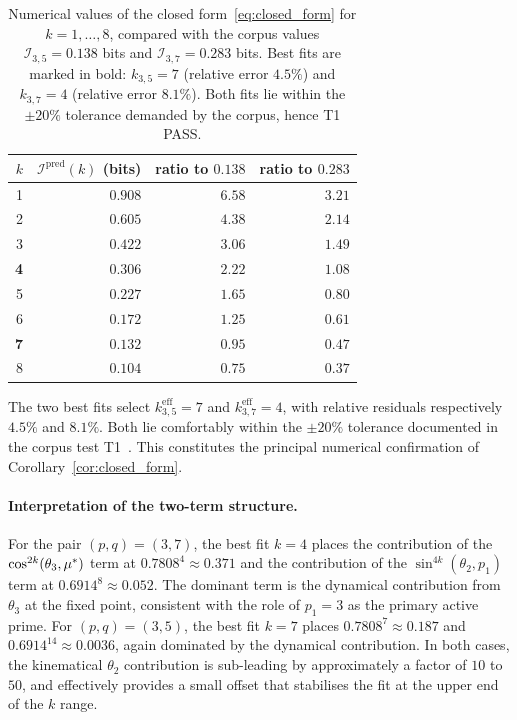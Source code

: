 \begin{table}[h]
\centering
\caption{Numerical values of the closed
form~\eqref{eq:closed_form} for $k = 1, \ldots, 8$, compared with
the corpus values $\mathcal{I}_{3,5} = 0.138$ bits and
$\mathcal{I}_{3,7} = 0.283$ bits. Best fits are marked in bold:
$k_{3,5} = 7$ (relative error $4.5\%$) and $k_{3,7} = 4$
(relative error $8.1\%$). Both fits lie within the $\pm 20\%$
tolerance demanded by the corpus, hence T1 PASS.}
\label{tab:closed_form_check}
\renewcommand{\arraystretch}{1.10}
\begin{tabular}{r r r r}
\toprule
$k$ & $\mathcal{I}^{\mathrm{pred}}(k)$ (bits)
    & ratio to $0.138$
    & ratio to $0.283$ \\
\midrule
1 & $0.908$ & $6.58$ & $3.21$ \\
2 & $0.605$ & $4.38$ & $2.14$ \\
3 & $0.422$ & $3.06$ & $1.49$ \\
\textbf{4} & $\mathbf{0.306}$ & $2.22$ & $\mathbf{1.08}$ \\
5 & $0.227$ & $1.65$ & $0.80$ \\
6 & $0.172$ & $1.25$ & $0.61$ \\
\textbf{7} & $\mathbf{0.132}$ & $\mathbf{0.95}$ & $0.47$ \\
8 & $0.104$ & $0.75$ & $0.37$ \\
\bottomrule
\end{tabular}
\end{table}

The two best fits select $k_{3,5}^{\mathrm{eff}} = 7$ and
$k_{3,7}^{\mathrm{eff}} = 4$, with relative residuals respectively
$4.5\%$ and $8.1\%$. Both lie comfortably within the
$\pm 20\%$ tolerance documented in the corpus test
T1~\cite[scripts/test\_crt\_decoupling.py]{PT_Monograph}. This
constitutes the principal numerical confirmation of
Corollary~\ref{cor:closed_form}.

\paragraph{Interpretation of the two-term structure.}
For the pair $(p, q) = (3, 7)$, the best fit $k = 4$ places the
contribution of the $\cos^{2k}(\theta_3, {\mu^{*}})$ term at
$0.7808^{4} \approx 0.371$ and the contribution of the
$\sin^{4k}(\theta_2, p_1)$ term at $0.6914^{8} \approx 0.052$. The
dominant term is the dynamical contribution from $\theta_3$ at the
fixed point, consistent with the role of $p_1 = 3$ as the primary
active prime. For $(p, q) = (3, 5)$, the best fit $k = 7$ places
$0.7808^{7} \approx 0.187$ and $0.6914^{14} \approx 0.0036$, again
dominated by the dynamical contribution. In both cases, the
kinematical $\theta_2$ contribution is sub-leading by approximately a
factor of $10$ to $50$, and effectively provides a small offset that
stabilises the fit at the upper end of the $k$ range.

